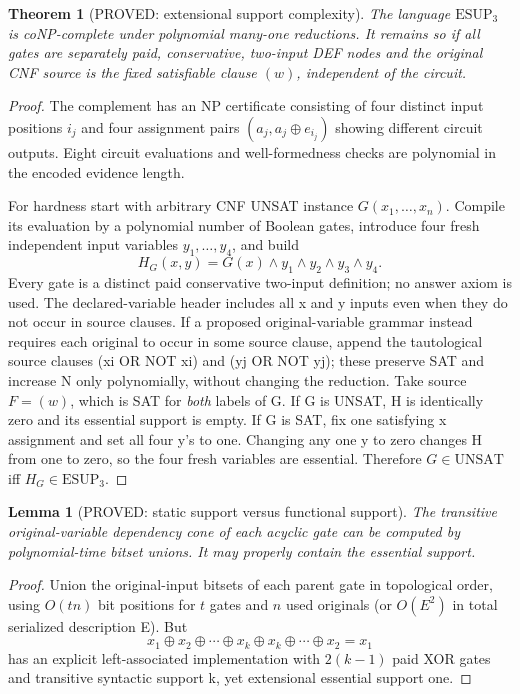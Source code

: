 \documentclass[11pt]{article}
\newtheorem{theorem}{Theorem}
\newtheorem{lemma}{Lemma}
\begin{document}
\begin{theorem}[PROVED: extensional support complexity]
The language \(\mathrm{ESUP}_3\) is coNP-complete under polynomial many-one reductions. It remains so if all gates are separately paid, conservative, two-input DEF nodes and the original CNF source is the fixed satisfiable clause \((w)\), independent of the circuit.
\end{theorem}
\begin{proof}
The complement has an NP certificate consisting of four distinct input positions \(i_j\) and four assignment pairs \((a_j,a_j\oplus e_{i_j})\) showing different circuit outputs. Eight circuit evaluations and well-formedness checks are polynomial in the encoded evidence length.

For hardness start with arbitrary CNF UNSAT instance \(G(x_1,\ldots,x_n)\). Compile its evaluation by a polynomial number of Boolean gates, introduce four fresh independent input variables \(y_1,\ldots,y_4\), and build
\[
 H_G(x,y)=G(x)\land y_1\land y_2\land y_3\land y_4.
\]
Every gate is a distinct paid conservative two-input definition; no answer axiom is used. The declared-variable header includes all x and y inputs even when they do not occur in source clauses. If a proposed original-variable grammar instead requires each original to occur in some source clause, append the tautological source clauses (xi OR NOT xi) and (yj OR NOT yj); these preserve SAT and increase N only polynomially, without changing the reduction. Take source \(F=(w)\), which is SAT for \emph{both} labels of G. If G is UNSAT, H is identically zero and its essential support is empty. If G is SAT, fix one satisfying x assignment and set all four y's to one. Changing any one y to zero changes H from one to zero, so the four fresh variables are essential. Therefore \(G\in\mathrm{UNSAT}\) iff \(H_G\in\mathrm{ESUP}_3\).
\end{proof}

\begin{lemma}[PROVED: static support versus functional support]
The transitive original-variable dependency cone of each acyclic gate can be computed by polynomial-time bitset unions. It may properly contain the essential support.
\end{lemma}
\begin{proof}
Union the original-input bitsets of each parent gate in topological order, using \(O(tn)\) bit positions for \(t\) gates and \(n\) used originals (or \(O(E^2)\) in total serialized description E). But
\[
 x_1\oplus x_2\oplus\cdots\oplus x_k\oplus x_k\oplus\cdots\oplus x_2=x_1
\]
has an explicit left-associated implementation with \(2(k-1)\) paid XOR gates and transitive syntactic support k, yet extensional essential support one.
\end{proof}
\end{document}
